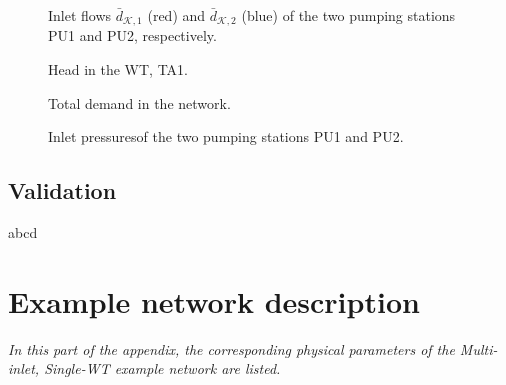 \newpage


 \begin{figure}[h!]
 \centering
  
 \label{fig:inlet_flows_example1}
 \end{figure}

\vspace{-8mm}

 \begin{figure}[h!]
 \centering
 \hspace{0.15mm}
  
 \vspace{-1.5mm}
 \caption{Inlet flows $\bar{d}_{\mathcal{K},1}$ (red) and $\bar{d}_{\mathcal{K},2}$ (blue) of the two pumping stations PU1 and PU2, respectively.}
 \label{fig:inlet_flows_example1}
 \end{figure}

 

\vspace{-3mm}

 \begin{figure}[H]
 \centering
  
 \vspace{-1.5mm}
 \caption{Head in the WT, TA1.}
 \label{fig:WT_head_example}
 \end{figure}

 \vspace{-3mm}

 \begin{figure}[H]
 \centering
  
 \vspace{-1.5mm}
 \caption{Total demand in the network.}
 \label{fig:sigma_example}
 \end{figure}

 \begin{figure}[H]
 \centering
  
 \vspace{-1.5mm}
 \caption{Inlet pressuresof the two pumping stations PU1 and PU2.}
 \label{fig:sigma_example}
 \end{figure}

\section{Validation}
\label{validation_tests} 

abcd

\chapter{Example network description}
\label{physical_properties_example1}

\emph{In this part of the appendix, the corresponding physical parameters of the Multi-inlet, Single-WT example network are listed.}




